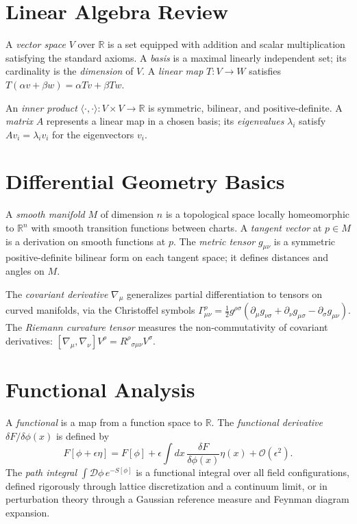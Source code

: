 \documentclass[12pt,a4paper,oneside]{book}
\theoremstyle{definition}
\theoremstyle{plain}
\theoremstyle{remark}
\begin{document}
\section{Linear Algebra Review}

A \emph{vector space} $V$ over $\mathbb{R}$ is a set equipped with addition
and scalar multiplication satisfying the standard axioms. A \emph{basis} is
a maximal linearly independent set; its cardinality is the \emph{dimension}
of $V$. A \emph{linear map} $T: V \to W$ satisfies $T(\alpha v + \beta w)
= \alpha Tv + \beta Tw$.

An \emph{inner product} $\langle\cdot,\cdot\rangle: V\times V \to \mathbb{R}$
is symmetric, bilinear, and positive-definite. A \emph{matrix} $A$ represents
a linear map in a chosen basis; its \emph{eigenvalues} $\lambda_i$ satisfy
$Av_i = \lambda_i v_i$ for the eigenvectors $v_i$.

\section{Differential Geometry Basics}

A \emph{smooth manifold} $M$ of dimension $n$ is a topological space locally
homeomorphic to $\mathbb{R}^n$ with smooth transition functions between charts.
A \emph{tangent vector} at $p \in M$ is a derivation on smooth functions at $p$.
The \emph{metric tensor} $g_{\mu\nu}$ is a symmetric positive-definite bilinear
form on each tangent space; it defines distances and angles on $M$.

The \emph{covariant derivative} $\nabla_\mu$ generalizes partial differentiation
to tensors on curved manifolds, via the Christoffel symbols
$\Gamma^\rho_{\mu\nu} = \frac{1}{2}g^{\rho\sigma}(\partial_\mu g_{\nu\sigma}
+ \partial_\nu g_{\mu\sigma} - \partial_\sigma g_{\mu\nu})$. The \emph{Riemann
curvature tensor} measures the non-commutativity of covariant derivatives:
$[\nabla_\mu,\nabla_\nu]V^\rho = R^\rho{}_{\sigma\mu\nu}V^\sigma$.

\section{Functional Analysis}

A \emph{functional} is a map from a function space to $\mathbb{R}$. The
\emph{functional derivative} $\delta F/\delta\phi(x)$ is defined by
\begin{equation}
F[\phi + \epsilon\eta] = F[\phi] + \epsilon\int dx\,\frac{\delta F}{\delta\phi(x)}\eta(x)
+ \mathcal{O}(\epsilon^2).
\end{equation}
The \emph{path integral} $\int\mathcal{D}\phi\,e^{-S[\phi]}$ is a functional
integral over all field configurations, defined rigorously through lattice
discretization and a continuum limit, or in perturbation theory through
a Gaussian reference measure and Feynman diagram expansion.
\end{document}
